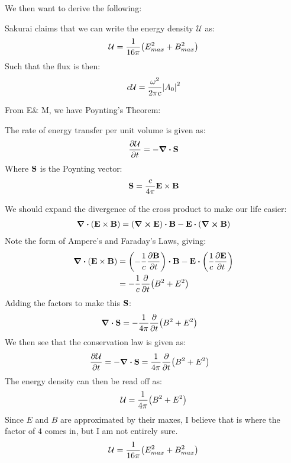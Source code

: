 \documentclass[12pt]{article}
\begin{document}
We then want to derive the following:
\begin{thebook*}
  Sakurai claims that we can write the energy density $\mathcal{U}$ as:
  \begin{align*}
    \mathcal{U}=\frac1{16\pi}\qty(E_{max}^2+B_{max}^2)
  \end{align*}
  Such that the flux is then:
  \begin{align*}
    c\mathcal{U}=\frac{\omega^2}{2\pi c}\abs{A_0}^2
  \end{align*}
\end{thebook*}
From E\& M, we have Poynting's Theorem:
\begin{theorem}
  The rate of energy transfer per unit volume is given as:
  \begin{align*}
    \pdv{\mathcal{U}}{t}=-\div{\vb{S}}
  \end{align*}
  Where $\vb{S}$ is the Poynting vector:
  \begin{align*}
    \vb{S}=\frac{c}{4\pi}\vb{E\times B}
  \end{align*}
\end{theorem}
We should expand the divergence of the cross product to make our life easier:
\begin{align*}
  \div{(\vb{E\times B})}=(\curl{\vb{E}})\vdot \vb{B}
  -\vb{E}\vdot(\curl{\vb{B}})
\end{align*}
Note the form of Ampere's and Faraday's Laws, giving:
\begin{align*}
  \div{(\vb{E\times B})}&=\qty(-\frac1c\pdv{\vb{B}}{t})\vdot \vb{B}
  -\vb{E}\vdot\qty(\frac1c\pdv{\vb{E}}{t})\\
  &=-\frac1c\pdv{t}\qty(B^2+E^2)
\end{align*}
Adding the factors to make this $\vb{S}$:
\begin{align*}
  \div{\vb{S}}&=-\frac1{4\pi}\pdv{t}\qty(B^2+E^2)
\end{align*}
We then see that the conservation law is given as:
\begin{align*}
  \pdv{\mathcal{U}}{t}=-\div{\vb{S}}&=\frac1{4\pi}\pdv{t}\qty(B^2+E^2)
\end{align*}
The energy density can then be read off as:
\begin{align*}
  \mathcal{U}=\frac1{4\pi}\qty(B^2+E^2)
\end{align*}
Since $E$ and $B$ are approximated by their maxes, I believe that is where the factor of $4$ comes in, but I am not entirely sure.
\begin{align*}
  \mathcal{U}=\frac1{16\pi}\qty(E^2_{max}+B^2_{max})
\end{align*}
\end{document}
